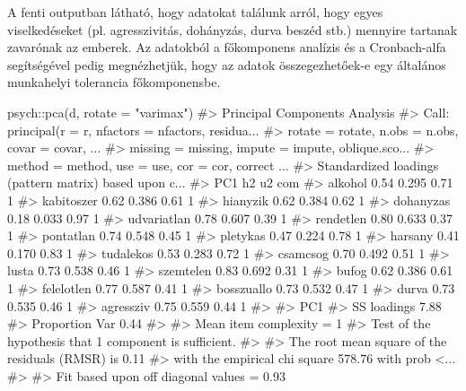 \documentclass[
  letterpaper,
]{krantz}
\makeatletter
\newenvironment{Shaded}{\begin{snugshade}}{\end{snugshade}}
\newcommand{\AttributeTok}[1]{\textcolor[rgb]{0.40,0.45,0.13}{#1}}
\newcommand{\CommentTok}[1]{\textcolor[rgb]{0.37,0.37,0.37}{#1}}
\newcommand{\FunctionTok}[1]{\textcolor[rgb]{0.28,0.35,0.67}{#1}}
\newcommand{\NormalTok}[1]{\textcolor[rgb]{0.00,0.23,0.31}{#1}}
\newcommand{\SpecialCharTok}[1]{\textcolor[rgb]{0.37,0.37,0.37}{#1}}
\newcommand{\StringTok}[1]{\textcolor[rgb]{0.13,0.47,0.30}{#1}}
\newenvironment{kframe}{%
\medskip{}
\setlength{\fboxsep}{.8em}
 \def\at@end@of@kframe{}%
 \ifinner\ifhmode%
  \def\at@end@of@kframe{\end{minipage}}%
  \begin{minipage}{\columnwidth}%
 \fi\fi%
 \def\FrameCommand##1{\hskip\@totalleftmargin \hskip-\fboxsep
 \colorbox{shadecolor}{##1}\hskip-\fboxsep
     \hskip-\linewidth \hskip-\@totalleftmargin \hskip\columnwidth}%
 \MakeFramed {\advance\hsize-\width
   \@totalleftmargin\z@ \linewidth\hsize
   \@setminipage}}%
 {\par\unskip\endMakeFramed%
 \at@end@of@kframe}
\renewenvironment{Shaded}{\begin{kframe}}{\end{kframe}}
\makeatother
\begin{document}
A fenti outputban látható, hogy adatokat találunk arról, hogy egyes
viselkedéseket (pl. agresszivitás, dohányzás, durva beszéd stb.)
mennyire tartanak zavarónak az emberek. Az adatokból a főkomponens
analízis és a Cronbach-alfa segítségével pedig megnézhetjük, hogy az
adatok összegezhetőek-e egy általános munkahelyi tolerancia
főkomponensbe.

\begin{Shaded}
\begin{Highlighting}[]
\NormalTok{psych}\SpecialCharTok{::}\FunctionTok{pca}\NormalTok{(d, }\AttributeTok{rotate =} \StringTok{"varimax"}\NormalTok{)}
\CommentTok{\#\textgreater{} Principal Components Analysis}
\CommentTok{\#\textgreater{} Call: principal(r = r, nfactors = nfactors, residua...}
\CommentTok{\#\textgreater{}     rotate = rotate, n.obs = n.obs, covar = covar, ...}
\CommentTok{\#\textgreater{}     missing = missing, impute = impute, oblique.sco...}
\CommentTok{\#\textgreater{}     method = method, use = use, cor = cor, correct ...}
\CommentTok{\#\textgreater{} Standardized loadings (pattern matrix) based upon c...}
\CommentTok{\#\textgreater{}              PC1    h2   u2 com}
\CommentTok{\#\textgreater{} alkohol     0.54 0.295 0.71   1}
\CommentTok{\#\textgreater{} kabitoszer  0.62 0.386 0.61   1}
\CommentTok{\#\textgreater{} hianyzik    0.62 0.384 0.62   1}
\CommentTok{\#\textgreater{} dohanyzas   0.18 0.033 0.97   1}
\CommentTok{\#\textgreater{} udvariatlan 0.78 0.607 0.39   1}
\CommentTok{\#\textgreater{} rendetlen   0.80 0.633 0.37   1}
\CommentTok{\#\textgreater{} pontatlan   0.74 0.548 0.45   1}
\CommentTok{\#\textgreater{} pletykas    0.47 0.224 0.78   1}
\CommentTok{\#\textgreater{} harsany     0.41 0.170 0.83   1}
\CommentTok{\#\textgreater{} tudalekos   0.53 0.283 0.72   1}
\CommentTok{\#\textgreater{} csamcsog    0.70 0.492 0.51   1}
\CommentTok{\#\textgreater{} lusta       0.73 0.538 0.46   1}
\CommentTok{\#\textgreater{} szemtelen   0.83 0.692 0.31   1}
\CommentTok{\#\textgreater{} bufog       0.62 0.386 0.61   1}
\CommentTok{\#\textgreater{} felelotlen  0.77 0.587 0.41   1}
\CommentTok{\#\textgreater{} bosszuallo  0.73 0.532 0.47   1}
\CommentTok{\#\textgreater{} durva       0.73 0.535 0.46   1}
\CommentTok{\#\textgreater{} agressziv   0.75 0.559 0.44   1}
\CommentTok{\#\textgreater{} }
\CommentTok{\#\textgreater{}                 PC1}
\CommentTok{\#\textgreater{} SS loadings    7.88}
\CommentTok{\#\textgreater{} Proportion Var 0.44}
\CommentTok{\#\textgreater{} }
\CommentTok{\#\textgreater{} Mean item complexity =  1}
\CommentTok{\#\textgreater{} Test of the hypothesis that 1 component is sufficient.}
\CommentTok{\#\textgreater{} }
\CommentTok{\#\textgreater{} The root mean square of the residuals (RMSR) is  0.11 }
\CommentTok{\#\textgreater{}  with the empirical chi square  578.76  with prob \textless{}...}
\CommentTok{\#\textgreater{} }
\CommentTok{\#\textgreater{} Fit based upon off diagonal values = 0.93}
\end{Highlighting}
\end{Shaded}
\end{document}
